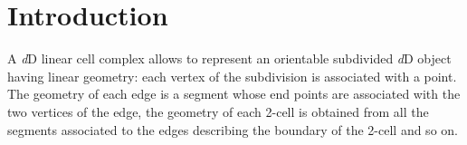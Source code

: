 \def\betats{\ccTexHtml{$\beta$}{&beta;}}
\def\betazero{\ccTexHtml{$\beta_0$}{&beta;<SUB>0</SUB>}}
\def\betaun{\ccTexHtml{$\beta_1$}{&beta;<SUB>1</SUB>}}
\def\betadeux{\ccTexHtml{$\beta_2$}{&beta;<SUB>2</SUB>}}
\def\betatrois{\ccTexHtml{$\beta_3$}{&beta;<SUB>3</SUB>}}
\def\betaquatre{\ccTexHtml{$\beta_4$}{&beta;<SUB>4</SUB>}}
\def\betai{\ccTexHtml{$\beta_i$}{&beta;<SUB>i</SUB>}}
\def\betad{\ccTexHtml{$\beta_d$}{&beta;<SUB>d</SUB>}}	
\def\betadprim{\ccTexHtml{$\beta_{d'}$}{&beta;<SUB>d'</SUB>}}
\def\betaimun{\ccTexHtml{$\beta_{i-1}$}{&beta;<SUB>i-1</SUB>}}
\def\betaipun{\ccTexHtml{$\beta_{i+1}$}{&beta;<SUB>i+1</SUB>}}
\def\betaimdeux{\ccTexHtml{$\beta_{i-2}$}{&beta;<SUB>i-2</SUB>}}
\def\betaipdeux{\ccTexHtml{$\beta_{i+2}$}{&beta;<SUB>i+2</SUB>}}
\def\betaj{\ccTexHtml{$\beta_j$}{&beta;<SUB>j</SUB>}}
\def\betajmun{\ccTexHtml{$\beta_{j-1}$}{&beta;<SUB>j-1</SUB>}}
\def\betaiinv{\ccTexHtml{$\beta_i^{-1}$}{&beta;<sub>i</sub><sup>-1</sup>}}
\def\betajinv{\ccTexHtml{$\beta_j^{-1}$}{&beta;<sub>j</sub><sup>-1</sup>}}

\def\comp{\ccTexHtml{$\circ$}{&deg;}}
\def\pinv{\ccTexHtml{$p^{-1}$}{p<SUP>-1</SUP>}}
\def\myith{\ccTexHtml{$i^{\mbox{th}}$}{i<SUP>th</SUP>}}

\def\myneq{\ccTexHtml{$\neq$}{&ne;}}
\def\myleq{\ccTexHtml{$\leq$}{&le;}}
\def\mylt{\ccTexHtml{$<$}{&lt;}}
\def\mygt{\ccTexHtml{$>$}{&gt;}}
\def\mygeq{\ccTexHtml{$\geq$}{&ge;}}
\def\mysubseteq{\ccTexHtml{$\subseteq$}{&sube;}}
\def\myforall{\ccTexHtml{$\forall$}{&forall;}}
\def\myemptyset{\ccTexHtml{$\emptyset$}{&empty;}}
\def\myRightarrow{\ccTexHtml{$\Rightarrow$}{&rArr;}}
\def\myrightarrow{\ccTexHtml{$\rightarrow$}{&rarr;}}
\def\myin{\ccTexHtml{$\in$}{&isin;}}
\def\mynotin{\ccTexHtml{$\notin$}{&notin;}}
\def\mycup{\ccTexHtml{$\cup$}{&cup;}}
\def\myphi{\ccTexHtml{$\phi$}{&phi;}}
\def\mysetminus{\ccTexHtml{$\setminus$}{\ }}
\def\myldots{\ccTexHtml{$\ldots$}{&hellip;}}
\def\mytimes{\ccTexHtml{$\times$}{&times;}}

\newcommand{\cell}[1]{\emph{#1}-cell}
\newcommand{\cells}[1]{\emph{#1}-cells}
\newcommand{\orbit}[1]{\ccTexHtml{$\langle{}$}{&lang;}#1\ccTexHtml{$\rangle{}$}{&rang;}}

\newcommand{\mb}[1]{\beta_{#1}}
\newcommand{\orb}[1]{\langle{}#1\rangle{}}

\section{Introduction}

A \emph{d}D linear cell complex allows to represent an orientable
subdivided \emph{d}D object having linear geometry: each vertex of the
subdivision is associated with a point. The geometry of each edge is a
segment whose end points are associated with the two vertices of the
edge, the geometry of each 2-cell is obtained from all the segments
associated to the edges describing the boundary of the 2-cell and so
on.

